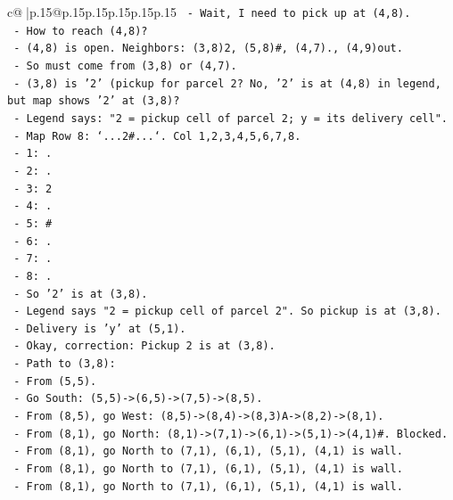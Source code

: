 \documentclass{article}
\begin{document}
{\begin{supertabular}{c@{$\;$}|p{.15\linewidth}@{}p{.15\linewidth}p{.15\linewidth}p{.15\linewidth}p{.15\linewidth}p{.15\linewidth}}
{{{\texttt{      {-} Wait, I need to pick up at (4,8).} \\
\texttt{      {-} How to reach (4,8)?} \\
\texttt{      {-} (4,8) is open. Neighbors: (3,8)2, (5,8)\#, (4,7)., (4,9)out.} \\
\texttt{      {-} So must come from (3,8) or (4,7).} \\
\texttt{      {-} (3,8) is '2' (pickup for parcel 2? No, '2' is at (4,8) in legend, but map shows '2' at (3,8)?} \\
\texttt{      {-} Legend says: "2 = pickup cell of parcel 2; y = its delivery cell".} \\
\texttt{      {-} Map Row 8: `...2\#...`. Col 1,2,3,4,5,6,7,8.} \\
\texttt{        {-} 1: .} \\
\texttt{        {-} 2: .} \\
\texttt{        {-} 3: 2} \\
\texttt{        {-} 4: .} \\
\texttt{        {-} 5: \#} \\
\texttt{        {-} 6: .} \\
\texttt{        {-} 7: .} \\
\texttt{        {-} 8: .} \\
\texttt{      {-} So '2' is at (3,8).} \\
\texttt{      {-} Legend says "2 = pickup cell of parcel 2". So pickup is at (3,8).} \\
\texttt{      {-} Delivery is 'y' at (5,1).} \\
\texttt{      {-} Okay, correction: Pickup 2 is at (3,8).} \\
\texttt{      {-} Path to (3,8):} \\
\texttt{        {-} From (5,5).} \\
\texttt{        {-} Go South: (5,5){-}>(6,5){-}>(7,5){-}>(8,5).} \\
\texttt{        {-} From (8,5), go West: (8,5){-}>(8,4){-}>(8,3)A{-}>(8,2){-}>(8,1).} \\
\texttt{        {-} From (8,1), go North: (8,1){-}>(7,1){-}>(6,1){-}>(5,1){-}>(4,1)\#. Blocked.} \\
\texttt{        {-} From (8,1), go North to (7,1), (6,1), (5,1), (4,1) is wall.} \\
\texttt{        {-} From (8,1), go North to (7,1), (6,1), (5,1), (4,1) is wall.} \\
\texttt{        {-} From (8,1), go North to (7,1), (6,1), (5,1), (4,1) is wall.} \\
}}}
\end{supertabular}}
\end{document}
